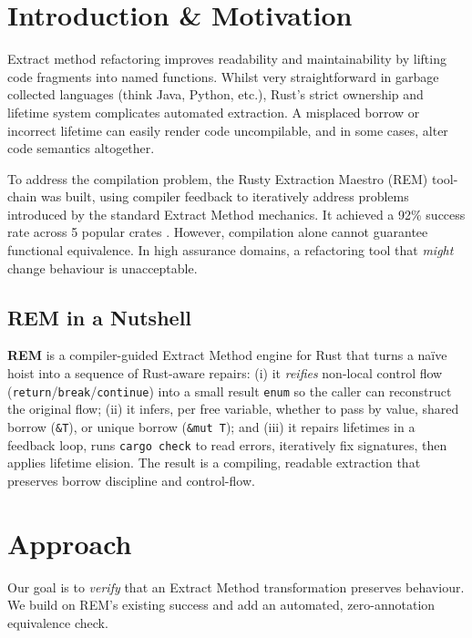\documentclass[format=sigplan,screen,10pt]{acmart}
\begin{document}
\section{Introduction \& Motivation}

Extract method refactoring improves readability and maintainability by lifting code fragments into named functions. Whilst very straightforward in garbage collected languages (think Java, Python, etc.), Rust's strict ownership and lifetime system complicates automated extraction. A misplaced borrow or incorrect lifetime can easily render code uncompilable, and in some cases, alter code semantics altogether. 

To address the compilation problem, the Rusty Extraction Maestro (REM) tool-chain was built, using compiler feedback to iteratively address problems introduced by the standard Extract Method mechanics. It achieved a 92\% success rate across 5 popular crates \cite{AdventureOfALifetime, BorrowingWithoutSorrowing}. However, compilation alone cannot guarantee functional equivalence. In high assurance domains, a refactoring tool that \textit{might} change behaviour is unacceptable. 

\vspace{-0.5\baselineskip}
\subsection{REM in a Nutshell}
\textbf{REM} is a compiler-guided Extract Method engine for Rust that turns a naïve hoist into a sequence of Rust-aware repairs: (i) it \emph{reifies} non-local control flow (\texttt{return}/\texttt{break}/\texttt{continue}) into a small result \texttt{enum} so the caller can reconstruct the original flow; (ii) it infers, per free variable, whether to pass by value, shared borrow (\texttt{\&T}), or unique borrow (\texttt{\&mut T}); and (iii) it repairs lifetimes in a feedback loop, runs \texttt{cargo check} to read errors, iteratively fix signatures, then applies lifetime elision. The result is a compiling, readable extraction that preserves borrow discipline and control-flow.

\vspace{-0.5\baselineskip}
\section{Approach}

Our goal is to \emph{verify} that an Extract Method transformation preserves behaviour. We build on REM's existing success and add an automated, zero-annotation equivalence check.
\end{document}
